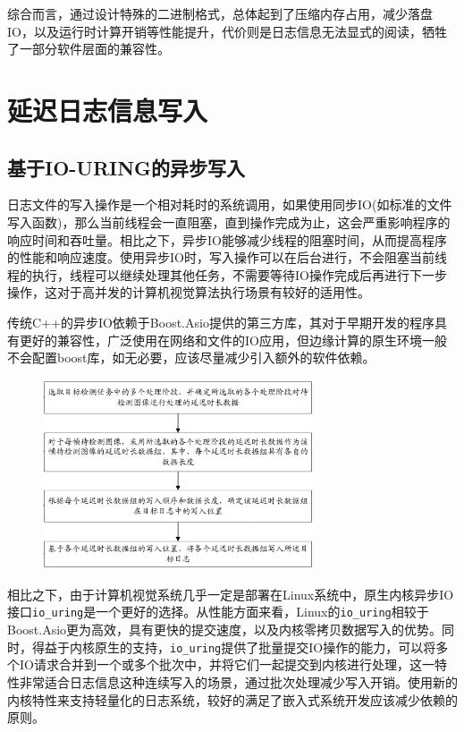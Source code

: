 \documentclass[master]{shtthesis}
\begin{document}
综合而言，通过设计特殊的二进制格式，总体起到了压缩内存占用，减少落盘IO，以及运行时计算开销等性能提升，代价则是日志信息无法显式的阅读，牺牲了一部分软件层面的兼容性。

\section{延迟日志信息写入}
\subsection{基于IO-URING的异步写入}

日志文件的写入操作是一个相对耗时的系统调用，如果使用同步IO(如标准的文件写入函数)，那么当前线程会一直阻塞，直到操作完成为止，这会严重影响程序的响应时间和吞吐量。相比之下，异步IO能够减少线程的阻塞时间，从而提高程序的性能和响应速度。使用异步IO时，写入操作可以在后台进行，不会阻塞当前线程的执行，线程可以继续处理其他任务，不需要等待IO操作完成后再进行下一步操作，这对于高并发的计算机视觉算法执行场景有较好的适用性。

传统C++的异步IO依赖于Boost.Asio\cite{anggoro2015boost}提供的第三方库，其对于早期开发的程序具有更好的兼容性，广泛使用在网络和文件的IO应用，但边缘计算的原生环境一般不会配置boost库，如无必要，应该尽量减少引入额外的软件依赖。

\begin{figure}[htbp]
	\centering
	\includegraphics[width=8cm]{img/z1.png}
	\label{延迟异步IO写入方式}
\end{figure}

相比之下，由于计算机视觉系统几乎一定是部署在Linux系统中，原生内核异步IO接口\verb*|io_uring|是一个更好的选择。从性能方面来看，Linux的\verb*|io_uring|相较于Boost.Asio更为高效，具有更快的提交速度，以及内核零拷贝数据写入的优势。同时，得益于内核原生的支持，\verb*|io_uring|提供了批量提交IO操作的能力，可以将多个IO请求合并到一个或多个批次中，并将它们一起提交到内核进行处理，这一特性非常适合日志信息这种连续写入的场景，通过批次处理减少写入开销。使用新的内核特性来支持轻量化的日志系统，较好的满足了嵌入式系统开发应该减少依赖的原则。
\end{document}
